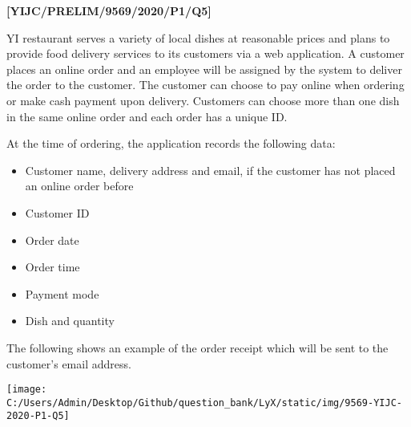 \item \textbf{{[}YIJC/PRELIM/9569/2020/P1/Q5{]} }

YI restaurant serves a variety of local dishes at reasonable prices
and plans to provide food delivery services to its customers via a
web application. A customer places an online order and an employee
will be assigned by the system to deliver the order to the customer.
The customer can choose to pay online when ordering or make cash payment
upon delivery. Customers can choose more than one dish in the same
online order and each order has a unique ID. 

At the time of ordering, the application records the following data: 
\begin{itemize}
\item Customer name, delivery address and email, if the customer has not
placed an online order before 
\item Customer ID 
\item Order date 
\item Order time 
\item Payment mode 
\item Dish and quantity 
\end{itemize}
The following shows an example of the order receipt which will be
sent to the customer\textquoteright s email address. 
\begin{center}
\texttt{[image: C:/Users/Admin/Desktop/Github/question\_bank/LyX/static/img/9569-YIJC-2020-P1-Q5]}
\par\end{center}

